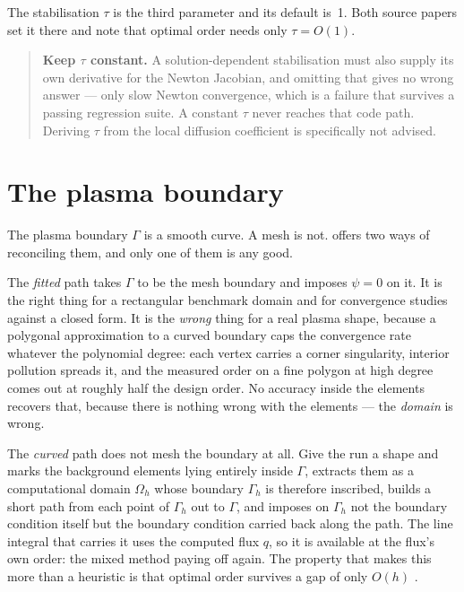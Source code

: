 The stabilisation $\tau$ is the third parameter and its default is~1. Both
source papers set it there and note that optimal order needs only
$\tau = O(1)$.

\begin{quote}
	\textbf{Keep $\tau$ constant.} A solution-dependent stabilisation must also
	supply its own derivative for the Newton Jacobian, and omitting that gives
	no wrong answer --- only slow Newton convergence, which is a failure that
	survives a passing regression suite. A constant $\tau$ never reaches that
	code path. Deriving $\tau$ from the local diffusion coefficient is
	specifically not advised.
\end{quote}

\section{The plasma boundary}
\label{sec:curved}

The plasma boundary $\Gamma$ is a smooth curve. A mesh is not. {\meq} offers
two ways of reconciling them, and only one of them is any good.

The \emph{fitted} path takes $\Gamma$ to be the mesh boundary and imposes
$\psi = 0$ on it. It is the right thing for a rectangular benchmark domain and
for convergence studies against a closed form. It is the \emph{wrong} thing for
a real plasma shape, because a polygonal approximation to a curved boundary caps
the convergence rate whatever the polynomial degree: each vertex carries a
corner singularity, interior pollution spreads it, and the measured order on a
fine polygon at high degree comes out at roughly half the design order. No
accuracy inside the elements recovers that, because there is nothing wrong with
the elements --- the \emph{domain} is wrong.

The \emph{curved} path does not mesh the boundary at all. Give the run a shape
and {\meq} marks the background elements lying entirely inside $\Gamma$,
extracts them as a computational domain $\Omega_h$ whose boundary $\Gamma_h$ is
therefore inscribed, builds a short path from each point of $\Gamma_h$ out to
$\Gamma$, and imposes on $\Gamma_h$ not the boundary condition itself but the
boundary condition carried back along the path. The line integral that carries
it uses the computed flux $q$, so it is available at the flux's own order: the
mixed method paying off again. The property that makes this more than a
heuristic is that optimal order survives a gap of only $O(h)$
\cite{CockburnSolano2012}.

